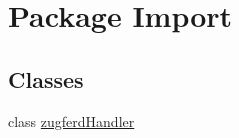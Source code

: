 \hypertarget{namespace_import}{}\section{Package Import}
\label{namespace_import}
\subsection*{Classes}
\begin{DoxyCompactItemize}
\item 
class \hyperlink{class_import_1_1zugferd_handler}{zugferd\+Handler}
\end{DoxyCompactItemize}
